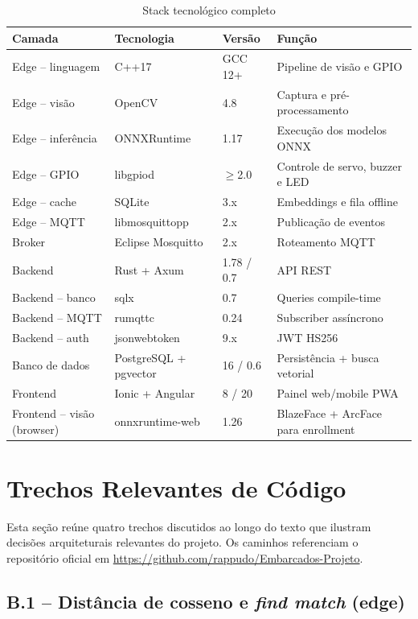 \documentclass[12pt,a4paper]{report}
\begin{document}
\begin{table}[H]
\centering
\caption{Stack tecnológico completo}
\label{tab:stack}
\begin{tabular}{llll}
\toprule
Camada & Tecnologia & Versão & Função \\
\midrule
Edge -- linguagem & C++17 & GCC 12+ & Pipeline de visão e GPIO \\
Edge -- visão & OpenCV & 4.8 & Captura e pré-processamento \\
Edge -- inferência & ONNXRuntime & 1.17 & Execução dos modelos ONNX \\
Edge -- GPIO & libgpiod & $\geq$2.0 & Controle de servo, buzzer e LED \\
Edge -- cache & SQLite & 3.x & Embeddings e fila offline \\
Edge -- MQTT & libmosquittopp & 2.x & Publicação de eventos \\
Broker & Eclipse Mosquitto & 2.x & Roteamento MQTT \\
Backend & Rust + Axum & 1.78 / 0.7 & API REST \\
Backend -- banco & sqlx & 0.7 & Queries compile-time \\
Backend -- MQTT & rumqttc & 0.24 & Subscriber assíncrono \\
Backend -- auth & jsonwebtoken & 9.x & JWT HS256 \\
Banco de dados & PostgreSQL + pgvector & 16 / 0.6 & Persistência + busca vetorial \\
Frontend & Ionic + Angular & 8 / 20 & Painel web/mobile PWA \\
Frontend -- visão (browser) & onnxruntime-web & 1.26 & BlazeFace + ArcFace para enrollment \\
\bottomrule
\end{tabular}
\end{table}

\chapter{Trechos Relevantes de Código}
\label{ap:codigo}

Esta seção reúne quatro trechos discutidos ao longo do texto que
ilustram decisões arquiteturais relevantes do projeto. Os caminhos
referenciam o repositório oficial em
\url{https://github.com/rappudo/Embarcados-Projeto}.

\section*{B.1 -- Distância de cosseno e \textit{find match} (edge)}
\end{document}
